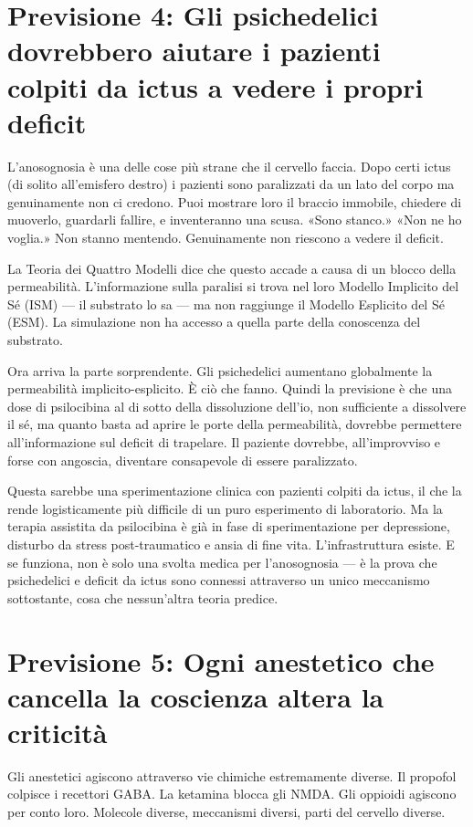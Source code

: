 \documentclass[11pt, twoside, openright]{book}
\begin{document}
\section*{Previsione 4: Gli psichedelici dovrebbero aiutare i pazienti colpiti da ictus a vedere i propri deficit}

L'anosognosia è una delle cose più strane che il cervello faccia. Dopo certi ictus (di solito all'emisfero destro) i pazienti sono paralizzati da un lato del corpo ma genuinamente non ci credono. Puoi mostrare loro il braccio immobile, chiedere di muoverlo, guardarli fallire, e inventeranno una scusa. «Sono stanco.» «Non ne ho voglia.» Non stanno mentendo. Genuinamente non riescono a vedere il deficit.

La Teoria dei Quattro Modelli dice che questo accade a causa di un blocco della permeabilità. L'informazione sulla paralisi si trova nel loro Modello Implicito del Sé (ISM) --- il substrato lo sa --- ma non raggiunge il Modello Esplicito del Sé (ESM). La simulazione non ha accesso a quella parte della conoscenza del substrato.

Ora arriva la parte sorprendente. Gli psichedelici aumentano globalmente la permeabilità implicito-esplicito. È ciò che fanno. Quindi la previsione è che una dose di psilocibina al di sotto della dissoluzione dell'io, non sufficiente a dissolvere il sé, ma quanto basta ad aprire le porte della permeabilità, dovrebbe permettere all'informazione sul deficit di trapelare. Il paziente dovrebbe, all'improvviso e forse con angoscia, diventare consapevole di essere paralizzato.

Questa sarebbe una sperimentazione clinica con pazienti colpiti da ictus, il che la rende logisticamente più difficile di un puro esperimento di laboratorio. Ma la terapia assistita da psilocibina è già in fase di sperimentazione per depressione, disturbo da stress post-traumatico e ansia di fine vita. L'infrastruttura esiste. E se funziona, non è solo una svolta medica per l'anosognosia --- è la prova che psichedelici e deficit da ictus sono connessi attraverso un unico meccanismo sottostante, cosa che nessun'altra teoria predice.

\section*{Previsione 5: Ogni anestetico che cancella la coscienza altera la criticità}

Gli anestetici agiscono attraverso vie chimiche estremamente diverse. Il propofol colpisce i recettori GABA. La ketamina blocca gli NMDA. Gli oppioidi agiscono per conto loro. Molecole diverse, meccanismi diversi, parti del cervello diverse.
\end{document}
